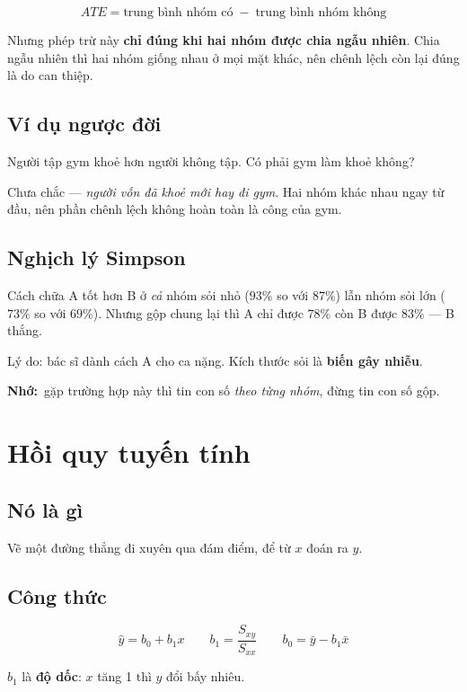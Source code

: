 \documentclass[12pt]{article}
\newcommand{\nho}{\textbf{Nhớ:}\ }
\begin{document}
\[
ATE = \text{trung bình nhóm có} \;-\; \text{trung bình nhóm không}
\]

Nhưng phép trừ này \textbf{chỉ đúng khi hai nhóm được chia ngẫu nhiên}. Chia ngẫu
nhiên thì hai nhóm giống nhau ở mọi mặt khác, nên chênh lệch còn lại đúng là do
can thiệp.

\subsection*{Ví dụ ngược đời}

Người tập gym khoẻ hơn người không tập. Có phải gym làm khoẻ không?

Chưa chắc --- \emph{người vốn đã khoẻ mới hay đi gym}. Hai nhóm khác nhau ngay từ
đầu, nên phần chênh lệch không hoàn toàn là công của gym.

\subsection*{Nghịch lý Simpson}

Cách chữa A tốt hơn B ở \emph{cả} nhóm sỏi nhỏ ($93\%$ so với $87\%$) lẫn nhóm sỏi
lớn ($73\%$ so với $69\%$). Nhưng gộp chung lại thì A chỉ được $78\%$ còn B được
$83\%$ --- B thắng.

Lý do: bác sĩ dành cách A cho ca nặng. Kích thước sỏi là \textbf{biến gây nhiễu}.

\nho gặp trường hợp này thì tin con số \emph{theo từng nhóm}, đừng tin con số gộp.

\section{Hồi quy tuyến tính}

\subsection*{Nó là gì}

Vẽ một đường thẳng đi xuyên qua đám điểm, để từ $x$ đoán ra $y$.

\subsection*{Công thức}

\[
\hat y = b_0 + b_1 x
\qquad
b_1 = \frac{S_{xy}}{S_{xx}}
\qquad
b_0 = \bar y - b_1 \bar x
\]

$b_1$ là \textbf{độ dốc}: $x$ tăng 1 thì $y$ đổi bấy nhiêu.
\end{document}
